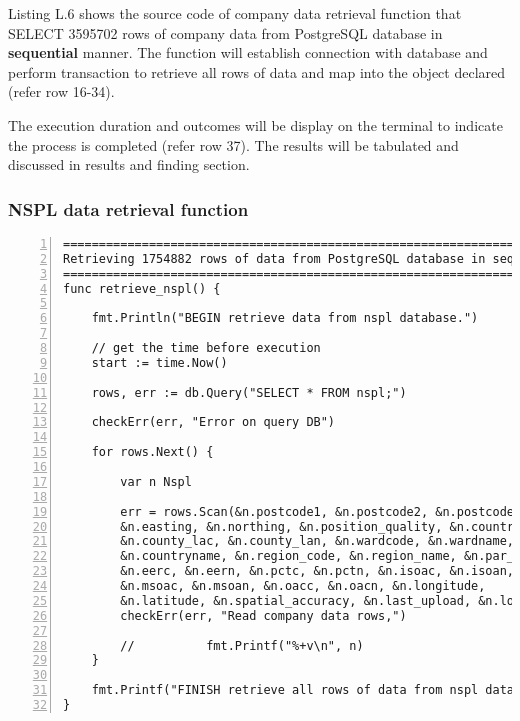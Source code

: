 Listing L.6 shows the source code of company data retrieval function that SELECT 3595702 rows of company data from PostgreSQL database in \textbf{sequential} manner. The function will establish connection with database and perform transaction to retrieve all rows of data and map into the object declared (refer row 16-34). 

The execution duration and outcomes will be display on the terminal to indicate the process is completed (refer row 37). The results will be tabulated and discussed in results and finding section. 

\newpage 

\subsubsection{NSPL data retrieval function}

\lstset{basicstyle=\ttfamily\tiny}  
\begin{lstlisting}[breaklines, frame=single, numbers=left, caption={Function for NSPL data retrieval. (retrieve\_nspl.go)}, label=commandline-02]
=============================================================================
Retrieving 1754882 rows of data from PostgreSQL database in sequential manner
=============================================================================
func retrieve_nspl() {

	fmt.Println("BEGIN retrieve data from nspl database.")
	
	// get the time before execution
	start := time.Now()
	
	rows, err := db.Query("SELECT * FROM nspl;")
	
	checkErr(err, "Error on query DB")	
	
	for rows.Next() {
	
		var n Nspl
		
		err = rows.Scan(&n.postcode1, &n.postcode2, &n.postcode3, &n.date_introduce, &n.usertype,
		&n.easting, &n.northing, &n.position_quality, &n.countrycode, &n.countryname,
		&n.county_lac, &n.county_lan, &n.wardcode, &n.wardname, &n.countrycode,
		&n.countryname, &n.region_code, &n.region_name, &n.par_cons_code, &n.par_cons_name,
		&n.eerc, &n.eern, &n.pctc, &n.pctn, &n.isoac, &n.isoan, 
		&n.msoac, &n.msoan, &n.oacc, &n.oacn, &n.longitude,
		&n.latitude, &n.spatial_accuracy, &n.last_upload, &n.location, &n.socrataid)
		checkErr(err, "Read company data rows,")
		
		//			fmt.Printf("%+v\n", n)
	}
	
	fmt.Printf("FINISH retrieve all rows of data from nspl database with %.5fs seconds. \n", time.Since(start).Seconds())
}

\end{lstlisting} 

